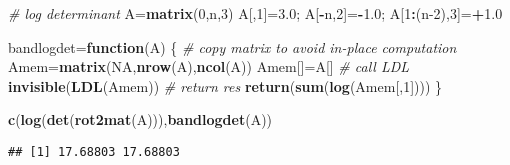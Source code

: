 \documentclass[
]{article}
\newenvironment{Shaded}{\begin{snugshade}}{\end{snugshade}}
\newcommand{\CommentTok}[1]{\textcolor[rgb]{0.56,0.35,0.01}{\textit{#1}}}
\newcommand{\ConstantTok}[1]{\textcolor[rgb]{0.56,0.35,0.01}{#1}}
\newcommand{\ControlFlowTok}[1]{\textcolor[rgb]{0.13,0.29,0.53}{\textbf{#1}}}
\newcommand{\DecValTok}[1]{\textcolor[rgb]{0.00,0.00,0.81}{#1}}
\newcommand{\FloatTok}[1]{\textcolor[rgb]{0.00,0.00,0.81}{#1}}
\newcommand{\FunctionTok}[1]{\textcolor[rgb]{0.13,0.29,0.53}{\textbf{#1}}}
\newcommand{\NormalTok}[1]{#1}
\newcommand{\OtherTok}[1]{\textcolor[rgb]{0.56,0.35,0.01}{#1}}
\newcommand{\SpecialCharTok}[1]{\textcolor[rgb]{0.81,0.36,0.00}{\textbf{#1}}}
\begin{document}
\begin{Shaded}
\begin{Highlighting}[]
\CommentTok{\# log determinant}
\NormalTok{A}\OtherTok{=}\FunctionTok{matrix}\NormalTok{(}\DecValTok{0}\NormalTok{,n,}\DecValTok{3}\NormalTok{)}
\NormalTok{A[,}\DecValTok{1}\NormalTok{]}\OtherTok{=}\FloatTok{3.0}\NormalTok{; A[}\SpecialCharTok{{-}}\NormalTok{n,}\DecValTok{2}\NormalTok{]}\OtherTok{=}\SpecialCharTok{{-}}\FloatTok{1.0}\NormalTok{; A[}\DecValTok{1}\SpecialCharTok{:}\NormalTok{(n}\DecValTok{{-}2}\NormalTok{),}\DecValTok{3}\NormalTok{]}\OtherTok{=}\SpecialCharTok{+}\FloatTok{1.0}

\NormalTok{bandlogdet}\OtherTok{=}\ControlFlowTok{function}\NormalTok{(A) \{}
  \CommentTok{\# copy matrix to avoid in{-}place computation}
\NormalTok{  Amem}\OtherTok{=}\FunctionTok{matrix}\NormalTok{(}\ConstantTok{NA}\NormalTok{,}\FunctionTok{nrow}\NormalTok{(A),}\FunctionTok{ncol}\NormalTok{(A))}
\NormalTok{  Amem[]}\OtherTok{=}\NormalTok{A[]}
  \CommentTok{\# call LDL}
  \FunctionTok{invisible}\NormalTok{(}\FunctionTok{LDL}\NormalTok{(Amem))}
  \CommentTok{\# return res}
  \FunctionTok{return}\NormalTok{(}\FunctionTok{sum}\NormalTok{(}\FunctionTok{log}\NormalTok{(Amem[,}\DecValTok{1}\NormalTok{])))}
\NormalTok{\}}

\FunctionTok{c}\NormalTok{(}\FunctionTok{log}\NormalTok{(}\FunctionTok{det}\NormalTok{(}\FunctionTok{rot2mat}\NormalTok{(A))),}\FunctionTok{bandlogdet}\NormalTok{(A))}
\end{Highlighting}
\end{Shaded}

\begin{verbatim}
## [1] 17.68803 17.68803
\end{verbatim}
\end{document}
